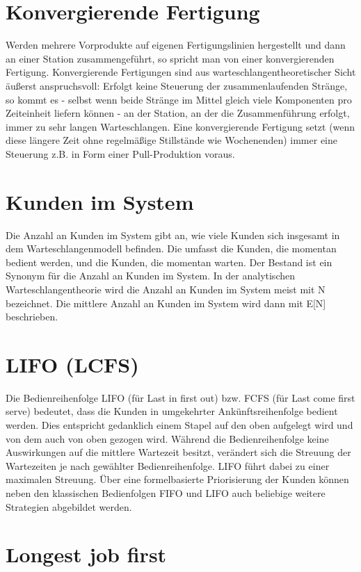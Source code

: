 \section*{Konvergierende Fertigung}


Werden mehrere Vorprodukte auf eigenen Fertigungslinien hergestellt und dann an einer Station
zusammengeführt, so spricht man von einer konvergierenden Fertigung. Konvergierende Fertigungen
sind aus warteschlangentheoretischer Sicht äußerst anspruchsvoll: Erfolgt keine Steuerung der
zusammenlaufenden Stränge, so kommt es - selbst wenn beide Stränge im Mittel gleich viele
Komponenten pro Zeiteinheit liefern können - an der Station, an der die Zusammenführung erfolgt,
immer zu sehr langen Warteschlangen. Eine konvergierende Fertigung setzt
(wenn diese längere Zeit ohne regelmäßige Stillstände wie Wochenenden) immer eine Steuerung z.B.
in Form einer Pull-Produktion voraus.

\section*{Kunden im System}


Die Anzahl an Kunden im System gibt an, wie viele Kunden sich insgesamt in dem Warteschlangenmodell
befinden. Die umfasst die Kunden, die momentan bedient werden, und die Kunden, die momentan warten.
Der Bestand ist ein Synonym für die Anzahl an Kunden im System.
In der analytischen Warteschlangentheorie wird die
Anzahl an Kunden im System meist mit N bezeichnet. Die mittlere Anzahl an Kunden im System
wird dann mit E[N] beschrieben.

\section*{LIFO (LCFS)}


Die Bedienreihenfolge LIFO (für Last in first out) bzw. FCFS (für Last come first serve) bedeutet,
dass die Kunden in umgekehrter Ankünftsreihenfolge bedient werden. Dies entspricht gedanklich einem Stapel
auf den oben aufgelegt wird und von dem auch von oben gezogen wird.
Während die Bedienreihenfolge keine Auswirkungen auf die mittlere Wartezeit besitzt, verändert sich
die Streuung der Wartezeiten je nach gewählter Bedienreihenfolge. LIFO führt dabei zu einer maximalen Streuung.
Über eine formelbasierte Priorisierung der Kunden können neben den klassischen Bedienfolgen FIFO und LIFO auch
beliebige weitere Strategien abgebildet werden.

\section*{Longest job first}


